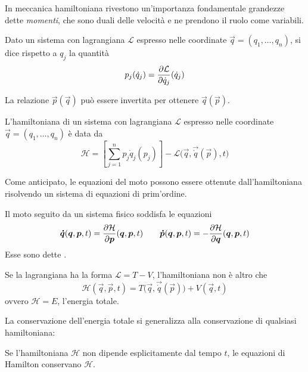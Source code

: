 In meccanica hamiltoniana rivestono un'importanza fondamentale grandezze dette \emph{momenti}, che sono duali delle velocità e ne prendono il ruolo come variabili.
\begin{definition}
  Dato un sistema con lagrangiana $\mathcal{L}$ espresso nelle coordinate $\vec{q}=(q_1, \ldots, q_n)$, si dice  rispetto a $q_j$ la quantità \begin{equation}
  p_j(\dot{q}_j) = \pdv{\mathcal{L}}{\dot{q}_j}() (\dot{q}_j)
  \end{equation} 
\end{definition}
\begin{remark}
  La relazione $\vec{p}(\vec{q})$ può essere invertita per ottenere $\vec{q}(\vec{p})$.
\end{remark}

\begin{theorem}
  L'hamiltoniana di un sistema con lagrangiana $\mathcal{L}$ espresso nelle coordinate $\vec{q}=(q_1, \ldots, q_n)$ è data da \begin{equation}
  \mathcal{H} = \left[\sum_{j=1}^{n} p_j \dot{q}_j (p_j)\right] - \mathcal{L}\big(\vec{q}, \vec{\dot{q}}(\vec{p}), t\big)
  \end{equation} 
\end{theorem}

Come anticipato, le equazioni del moto possono essere ottenute dall'hamiltoniana risolvendo un sistema di equazioni di prim'ordine.
\begin{theorem}
  Il moto seguito da un sistema fisico soddisfa le equazioni \begin{equation}
  \boldsymbol{\dot{q}}(\boldsymbol{q},\boldsymbol{p},t) = \pdv{\mathcal{H}}{\boldsymbol{p}}()(\boldsymbol{q},\boldsymbol{p},t) \qquad \boldsymbol{\dot{p}}(\boldsymbol{q},\boldsymbol{p},t) = -\pdv{\mathcal{H}}{\boldsymbol{q}}()(\boldsymbol{q},\boldsymbol{p},t)
  \end{equation}
  Esse sono dette .
\end{theorem}

\begin{theorem}
  Se la lagrangiana ha la forma $\mathcal{L} = T - V$, l'hamiltoniana non è altro che \begin{equation}
  \mathcal{H}(\vec{q},\vec{p},t) = T\big(\vec{q},\vec{\dot{q}}(\vec{p})\big) + V(\vec{q},t)
  \end{equation} 
  ovvero $\mathcal{H} = E$, l'energia totale.
\end{theorem}

La conservazione dell'energia totale si generalizza alla conservazione di qualsiasi hamiltoniana:
\begin{theorem}
  Se l'hamiltoniana $\mathcal{H}$ non dipende esplicitamente dal tempo $t$, le equazioni di Hamilton conservano $\mathcal{H}$.
\end{theorem}

